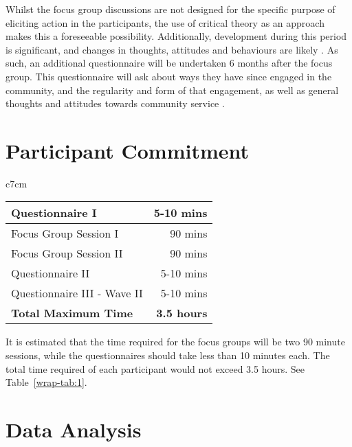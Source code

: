 Whilst the focus group discussions are not designed for the specific purpose of eliciting action in the participants, the use of critical theory as an approach makes this a foreseeable possibility. Additionally, development during this period is significant, and changes in thoughts, attitudes and behaviours are likely \citep{Pfeifer2012,Blakemore2012}. As such, an additional questionnaire will be undertaken 6 months after the focus group. This questionnaire will ask about ways they have since engaged in the community, and the regularity and form of that engagement, as well as general thoughts and attitudes towards community service \citep{Johnson2010}. 

\newpage
\section{Participant Commitment}	
\begin{wraptable}{c}{7cm}
	\caption{Expected Participant Commitment}\label{wrap-tab:1}
	\begin{tabular}{lr} \\\toprule  
		Questionnaire I & 5-10 mins \\\midrule
		Focus Group Session I & 90 mins \\  \midrule
		Focus Group Session II & 90 mins \\  \midrule
		Questionnaire II & 5-10 mins \\  \midrule
		Questionnaire III - Wave II     & 5-10 mins \\  \midrule
		\textbf{Total Maximum Time} & \textbf{3.5 hours} \\  \bottomrule
	\end{tabular}
\end{wraptable} 

It is estimated that the time required for the focus groups will be two 90 minute sessions, while the questionnaires should take less than 10 minutes each. The total time required of each participant would not exceed 3.5 hours. See Table~\ref{wrap-tab:1}.

\section{Data Analysis}


